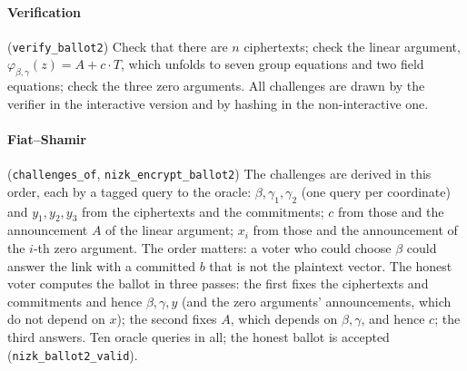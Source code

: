\documentclass[11pt,a4paper]{article}
\newcommand{\rocq}[1]{\texttt{#1}}
\theoremstyle{remark}
\begin{document}
\paragraph{Verification} (\rocq{verify\_ballot2}) Check that there are $n$
ciphertexts; check the linear argument, $\varphi_{\beta,\gamma}(z) = A + c
\cdot T$, which unfolds to seven group equations and two field equations;
check the three zero arguments. All challenges are drawn by the verifier
in the interactive version and by hashing in the non-interactive one.

\paragraph{Fiat--Shamir} (\rocq{challenges\_of}, \rocq{nizk\_encrypt\_ballot2})
The challenges are derived in this order, each by a tagged query to the
oracle: $\beta, \gamma_1, \gamma_2$ (one query per coordinate) and $y_1,
y_2, y_3$ from the ciphertexts and the commitments; $c$ from those and the
announcement $A$ of the linear argument; $x_i$ from those and the
announcement of the $i$-th zero argument. The order matters: a voter who
could choose $\beta$ could answer the link with a committed $b$ that is not
the plaintext vector. The honest voter computes the ballot in three
passes: the first fixes the ciphertexts and commitments and hence $\beta,
\gamma, y$ (and the zero arguments' announcements, which do not depend on
$x$); the second fixes $A$, which depends on $\beta, \gamma$, and hence
$c$; the third answers. Ten oracle queries in all; the honest ballot is
accepted (\rocq{nizk\_ballot2\_valid}).
\end{document}
